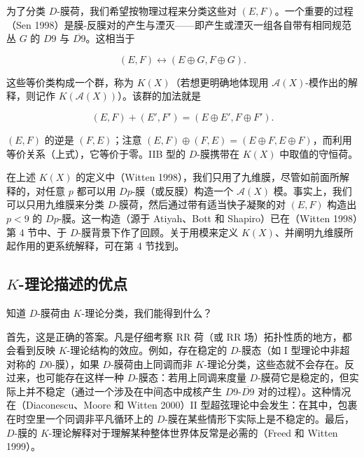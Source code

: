 为了分类 \(D\)-膜荷，我们希望按物理过程来分类这些对 \((E,F)\)。一个重要的过程（Sen 1998）是膜-反膜对的产生与湮灭——即产生或湮灭一组各自带有相同规范丛 \(G\) 的 \(D9\) 与 \(\overline{D9}\)。这相当于

\begin{equation}\tag{1.2}\label{eq:1.2}
(E,F)\leftrightarrow(E\oplus G,F\oplus G).
\end{equation}

这些等价类构成一个群，称为 \(K(X)\)（若想更明确地体现用 \(\mathcal{A}(X)\)-模作出的解释，则记作 \(K(\mathcal{A}(X))\)）。该群的加法就是

\begin{equation}\tag{1.3}\label{eq:1.3}
(E,F)+(E',F')=(E\oplus E',F\oplus F').
\end{equation}

\((E,F)\) 的逆是 \((F,E)\)；注意 \((E,F)\oplus (F,E)=(E\oplus F,E\oplus F)\)，而利用等价关系（上式），它等价于零。IIB 型的 \(D\)-膜携带在 \(K(X)\) 中取值的守恒荷。

在上述 \(K(X)\) 的定义中（Witten 1998），我们只用了九维膜，尽管如前面所解释的，对任意 \(p\) 都可以用 \(Dp\)-膜（或反膜）构造一个 \(\mathcal{A}(X)\) 模。事实上，我们可以只用九维膜来分类 \(D\)-膜荷，然后通过带有适当快子凝聚的对 \((E,F)\) 构造出 \(p<9\) 的 \(Dp\)-膜。这一构造（源于 Atiyah、Bott 和 Shapiro）已在（Witten 1998）第 4 节中、于 \(D\)-膜背景下作了回顾。关于用模来定义 \(K(X)\)、并阐明九维膜所起作用的更系统解释，可在第 4 节找到。

\subsection{\texorpdfstring{\(K\)-理论描述的优点}{K-理论描述的优点}}

知道 \(D\)-膜荷由 \(K\)-理论分类，我们能得到什么？

首先，这是正确的答案。凡是仔细考察 RR 荷（或 RR 场）拓扑性质的地方，都会看到反映 \(K\)-理论结构的效应。例如，存在稳定的 \(D\)-膜态（如 I 型理论中非超对称的 \(D0\)-膜），如果 \(D\)-膜荷由上同调而非 \(K\)-理论分类，这些态就不会存在。反过来，也可能存在这样一种 \(D\)-膜态：若用上同调来度量 \(D\)-膜荷它是稳定的，但实际上并不稳定（通过一个涉及在中间态中成核产生 \(D9\)-\(\overline{D9}\) 对的过程）。这种情况在（Diaconescu、Moore 和 Witten 2000）II 型超弦理论中会发生：在其中，包裹在时空里一个同调非平凡循环上的 \(D\)-膜在某些情形下实际上是不稳定的。最后，\(D\)-膜的 \(K\)-理论解释对于理解某种整体世界体反常是必需的（Freed 和 Witten 1999）。

